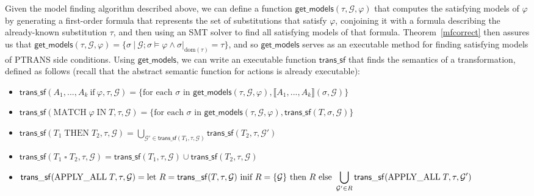 \documentclass{eptcs}
\newcommand{\ptrans}[0]{PTRANS}
\newcommand{\transsfe}[3]{\mathsf{trans\_sf}(#1, #2, #3)}
\begin{document}
Given the model finding algorithm described above, we can define a function $\mathsf{get\_models}(\tau, \mathcal{G}, \varphi)$ that computes the satisfying models of $\varphi$ by generating a first-order formula that represents the set of substitutions that satisfy $\varphi$, conjoining it with a formula describing the already-known substitution $\tau$, and then using an SMT solver to find all satisfying models of that formula. Theorem~\ref{mfcorrect} then assures us that $\mathsf{get\_models}(\tau, \mathcal{G}, \varphi) = \{\sigma\ |\ \mathcal{G}; \sigma \vDash \varphi \land \sigma|_{\mathrm{dom}(\tau)} = \tau\}$, and so $\mathsf{get\_models}$ serves as an executable method for finding satisfying models of {\ptrans} side conditions.
Using $\mathsf{get\_models}$, we can write an executable function $\mathsf{trans\_sf}$ that finds the semantics of a transformation, defined as follows (recall that the abstract semantic function for actions is already executable):
\begin{itemize}[itemindent=-2.05in, leftmargin=2.455in]
\item $\transsfe{A_1,...,A_k\ \mathrm{if}\ \varphi}{\tau}{\mathcal{G}} = \{\text{for each }\sigma\text{ in }\mathsf{get\_models}(\tau, \mathcal{G}, \varphi), \llbracket A_1, ..., A_k \rrbracket(\sigma, \mathcal{G})\}$
\item $\transsfe{\mathrm{MATCH}\;\varphi\;\mathrm{IN}\;T}{\tau}{\mathcal{G}} = \{\text{for each }\sigma\text{ in }\mathsf{get\_models}(\tau, \mathcal{G}, \varphi), \transsfe{T}{\sigma}{\mathcal{G}}\}$
\item $\transsfe{T_1\;\mathrm{THEN}\;T_2}{\tau}{\mathcal{G}} = \displaystyle\bigcup\limits_{\mathcal{G}' \in \transsfe{T_1}{\tau}{\mathcal{G}}} \transsfe{T_2}{\tau}{\mathcal{G}'}$
\item $\transsfe{T_1\;\square\;T_2}{\tau}{\mathcal{G}} = \transsfe{T_1}{\tau}{\mathcal{G}} \cup \transsfe{T_2}{\tau}{\mathcal{G}}$
\item $\transsfe{\mathrm{APPLY\_ALL}\;T}{\tau}{\mathcal{G}} = \text{let }R = \transsfe{T}{\tau}{\mathcal{G}}\text{ in} \\
\text{if }R = \{\mathcal{G}\} \text{ then } R \text{ else }\displaystyle\bigcup\limits_{\mathcal{G}' \in R} \transsfe{\mathrm{APPLY\_ALL}\;T}{\tau}{\mathcal{G}'}$
\end{itemize}
\end{document}
